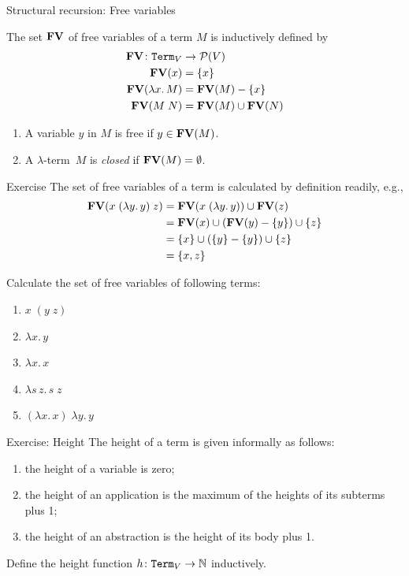 \begin{frame}{Structural recursion: Free variables}
\begin{definition}
  The set $\mathbf{FV}$ of free variables of a term $M$ is inductively defined by
  \begin{align*}
    \mathbf{FV} \colon  \mathtt{Term}_V & \to \mathcal{P}(V) \\
    \mathbf{FV}(x) & = \{x\} \\
    \mathbf{FV}(\lambda x.\, M) & = \mathbf{FV}(M) - \{x\} \\
    \mathbf{FV}(M\;N) & = \mathbf{FV}(M) \cup \mathbf{FV}(N)
  \end{align*}
\end{definition}
\begin{definition}
  \begin{enumerate}
    \item A variable $y$ in $M$ is \alert{free} if $y \in \mathbf{FV}(M)$.
    \item A $\lambda$-term~$M$ is \alert{\emph{closed}} if $\mathbf{FV}(M) = \emptyset$. 
  \end{enumerate}
\end{definition}

\end{frame}

\begin{frame}{Exercise}
  The set of free variables of a term is calculated by definition readily, e.g., 
    \begin{align*}
      \mathbf{FV}(x\;(\lambda y.\, y)\;z) & = \mathbf{FV}(x\;(\lambda y.\, y)) \cup \mathbf{FV}(z) \\ 
                                  & = \mathbf{FV}(x) \cup (\mathbf{FV}(y) - \{y\}) \cup \{z\} \\
                                  & = \{x\} \cup (\{y\}-\{y\}) \cup \{z\} \\
                                  & = \{x, z\}
    \end{align*}

  Calculate the set of free variables of following terms:
  \begin{enumerate}
    \item $x\;(y\; z) $
    \item $\lambda x.\, y$
    \item $\lambda x.\, x$
    \item $\lambda s\,z.\, s \;z$
    \item $(\lambda x.\, x)\;\lambda y.\, y$
  \end{enumerate}
\end{frame}

\begin{frame}{Exercise: Height}
  The height of a term is given informally as follows:
  \begin{enumerate}
    \item the height of a variable is zero;
    \item the height of an application is the maximum of the heights of its subterms plus 1;
    \item the height of an abstraction is the height of its body plus 1.
  \end{enumerate}
  
  Define the height function $h\colon \mathtt{Term}_V \to \mathbb{N}$ inductively.
\end{frame}

